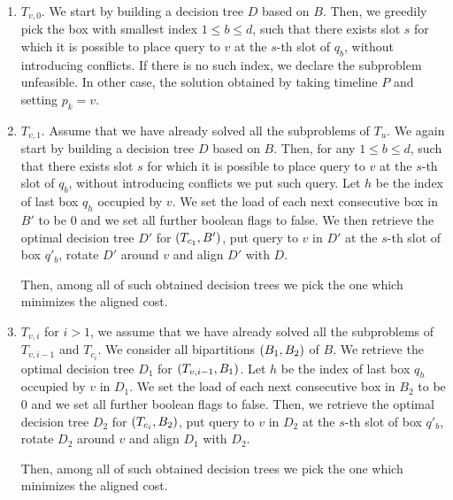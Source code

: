 

 
    \begin{enumerate}
        \item $T_{v,0}$. We start by building a decision tree $D$ based on $B$. Then, we greedily pick the box with smallest index $1 \leq b \leq d$, such that there exists slot $s$ for which it is possible to place query to $v$ at the $s$-th slot of $q_b$, without introducing conflicts. If there is no such index, we declare the subproblem unfeasible. In other case, the solution obtained by taking timeline $P$ and setting $p_k=v$.
        \item $T_{v,1}$. Assume that we have already solved all the subproblems of $T_u$. We again start by building a decision tree $D$ based on $B$. Then, for any $1 \leq b \leq d$, such that there exists slot $s$ for which it is possible to place query to $v$ at the $s$-th slot of $q_b$, without introducing conflicts we put such query. Let $h$ be the index of last box $q_h$ occupied by $v$. We set the load of each next consecutive box in $B'$ to be $0$ and we set all further boolean flags to false. We then retrieve the optimal decision tree $D'$ for $\mathopen{}\left( T_{c_1}, B' \right)$, put query to $v$ in $D'$ at the $s$-th slot of box $q'_b$, rotate $D'$ around $v$ and align $D'$ with $D$.

        Then, among all of such obtained decision trees we pick the one which minimizes the aligned cost.
        \item $T_{v,i}$ for $i>1$, we assume that we have already solved all the subproblems of $T_{v,i-1}$ and $T_{c_i}$. We consider all bipartitions $\mathopen{}\left( B_1, B_2 \right)$ of $B$. We retrieve the optimal decision tree $D_1$ for $\mathopen{}\left( T_{v, {i-1}}, B_1 \right)$. Let $h$ be the index of last box $q_h$ occupied by $v$ in $D_1$. We set the load of each next consecutive box in $B_2$ to be $0$ and we set all further boolean flags to false. Then, we retrieve the optimal decision tree $D_2$ for $\mathopen{}\left( T_{c_{i}}, B_2 \right)$, put query to $v$ in $D_2$ at the $s$-th slot of box $q'_b$, rotate $D_2$ around $v$ and align $D_1$ with $D_2$.
        
        Then, among all of such obtained decision trees we pick the one which minimizes the aligned cost.
    \end{enumerate}

 








